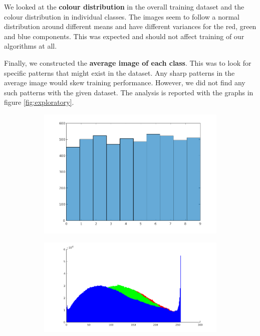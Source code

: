 \documentclass{article} %
\begin{document}
    We looked at the \textbf{colour distribution} in the overall training dataset and the colour distribution in individual classes. The images seem to follow a normal distribution around different means and have different variances for the red, green and blue components. This was expected and should not affect training of our algorithms at all.

    Finally, we constructed the \textbf{average image of each class}. This was to look for specific patterns that might exist in the dataset. Any sharp patterns in the average image would skew training performance. However, we did not find any such patterns with the given dataset. The analysis is reported with the graphs in figure \ref{fig:exploratory}.

    \begin{figure}
        \centering
        \begin{subfigure}{.24\linewidth}
            \centering
            \includegraphics[width=\linewidth]{images/label-distribution.png}
        \caption{}
        \end{subfigure}
        \begin{subfigure}{.24\linewidth}
            \centering
            \includegraphics[width=\linewidth]{images/hist-overall.png}

\end{subfigure}
\end{figure}
\end{document}
